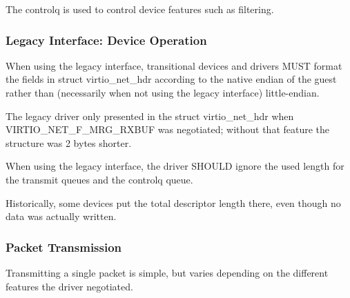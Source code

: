 The controlq is used to control device features such as
filtering.

\subsubsection{Legacy Interface: Device Operation}\label{sec:Device Types / Network Device / Device Operation / Legacy Interface: Device Operation}
When using the legacy interface, transitional devices and drivers
MUST format the fields in struct virtio_net_hdr
according to the native endian of the guest rather than
(necessarily when not using the legacy interface) little-endian.

The legacy driver only presented  in the struct virtio_net_hdr
when VIRTIO_NET_F_MRG_RXBUF was negotiated; without that feature the
structure was 2 bytes shorter.

When using the legacy interface, the driver SHOULD ignore the
used length for the transmit queues
and the controlq queue.
\begin{note}
Historically, some devices put
the total descriptor length there, even though no data was
actually written.
\end{note}

\subsubsection{Packet Transmission}\label{sec:Device Types / Network Device / Device Operation / Packet Transmission}

Transmitting a single packet is simple, but varies depending on
the different features the driver negotiated.

